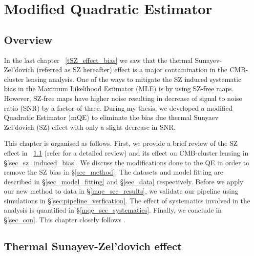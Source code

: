 \chapter{Modified Quadratic Estimator}
\label{ch:mqe}
\section*{Overview}\label{ovr}
In the last chapter ~\ref{tSZ_effect_bias} we saw that the thermal Sunayev-Zel'dovich (referred as SZ hereafter) effect is a major contamination in the CMB-cluster lensing analysis. 
One of the ways to mitigate the SZ induced systematic bias in the Maximum Likelihood Estimator (MLE) is by using SZ-free maps.
However, SZ-free maps have higher noise resulting in decrease of signal to noise ratio (SNR) by a factor of three. 
 During my thesis, we developed a modified Quadratic Estimator (mQE) to eliminate the bias due thermal Sunyaev Zel'dovich (SZ) effect with only a slight decrease in SNR. 


This chapter is organised as follows. First, we provide a brief review of the SZ effect in ~\ref{SZ} (refer \cite{sunyaev70b} for a detailed review) and its effect on CMB-cluster lensing in \S\ref{sec_sz_induced_bias}.
We discuss the modifications done to the QE in order to remove the SZ bias in \S\ref{sec_method}.
 The datasets and model fitting are described in  \S\ref{sec_model_fitting} and \S\ref{sec_data} respectively.
 Before we apply our new method to data in \S\ref{mqe_sec_results}, we validate our pipeline using simulations in \S\ref{sec:pipeline_verfication}. The effect of systematics involved in the analysis  is quantified in \S\ref{mqe_sec_systematics}.
Finally, we conclude in \S\ref{sec_con}. %
This chapter closely follows \citet{raghunathan18}.%


\section{Thermal Sunayev-Zel'dovich effect}\label{SZ}

